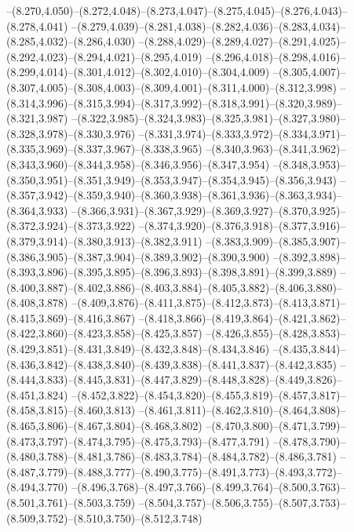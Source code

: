   --(8.270,4.050)--(8.272,4.048)--(8.273,4.047)--(8.275,4.045)--(8.276,4.043)--(8.278,4.041)%
  --(8.279,4.039)--(8.281,4.038)--(8.282,4.036)--(8.283,4.034)--(8.285,4.032)--(8.286,4.030)%
  --(8.288,4.029)--(8.289,4.027)--(8.291,4.025)--(8.292,4.023)--(8.294,4.021)--(8.295,4.019)%
  --(8.296,4.018)--(8.298,4.016)--(8.299,4.014)--(8.301,4.012)--(8.302,4.010)--(8.304,4.009)%
  --(8.305,4.007)--(8.307,4.005)--(8.308,4.003)--(8.309,4.001)--(8.311,4.000)--(8.312,3.998)%
  --(8.314,3.996)--(8.315,3.994)--(8.317,3.992)--(8.318,3.991)--(8.320,3.989)--(8.321,3.987)%
  --(8.322,3.985)--(8.324,3.983)--(8.325,3.981)--(8.327,3.980)--(8.328,3.978)--(8.330,3.976)%
  --(8.331,3.974)--(8.333,3.972)--(8.334,3.971)--(8.335,3.969)--(8.337,3.967)--(8.338,3.965)%
  --(8.340,3.963)--(8.341,3.962)--(8.343,3.960)--(8.344,3.958)--(8.346,3.956)--(8.347,3.954)%
  --(8.348,3.953)--(8.350,3.951)--(8.351,3.949)--(8.353,3.947)--(8.354,3.945)--(8.356,3.943)%
  --(8.357,3.942)--(8.359,3.940)--(8.360,3.938)--(8.361,3.936)--(8.363,3.934)--(8.364,3.933)%
  --(8.366,3.931)--(8.367,3.929)--(8.369,3.927)--(8.370,3.925)--(8.372,3.924)--(8.373,3.922)%
  --(8.374,3.920)--(8.376,3.918)--(8.377,3.916)--(8.379,3.914)--(8.380,3.913)--(8.382,3.911)%
  --(8.383,3.909)--(8.385,3.907)--(8.386,3.905)--(8.387,3.904)--(8.389,3.902)--(8.390,3.900)%
  --(8.392,3.898)--(8.393,3.896)--(8.395,3.895)--(8.396,3.893)--(8.398,3.891)--(8.399,3.889)%
  --(8.400,3.887)--(8.402,3.886)--(8.403,3.884)--(8.405,3.882)--(8.406,3.880)--(8.408,3.878)%
  --(8.409,3.876)--(8.411,3.875)--(8.412,3.873)--(8.413,3.871)--(8.415,3.869)--(8.416,3.867)%
  --(8.418,3.866)--(8.419,3.864)--(8.421,3.862)--(8.422,3.860)--(8.423,3.858)--(8.425,3.857)%
  --(8.426,3.855)--(8.428,3.853)--(8.429,3.851)--(8.431,3.849)--(8.432,3.848)--(8.434,3.846)%
  --(8.435,3.844)--(8.436,3.842)--(8.438,3.840)--(8.439,3.838)--(8.441,3.837)--(8.442,3.835)%
  --(8.444,3.833)--(8.445,3.831)--(8.447,3.829)--(8.448,3.828)--(8.449,3.826)--(8.451,3.824)%
  --(8.452,3.822)--(8.454,3.820)--(8.455,3.819)--(8.457,3.817)--(8.458,3.815)--(8.460,3.813)%
  --(8.461,3.811)--(8.462,3.810)--(8.464,3.808)--(8.465,3.806)--(8.467,3.804)--(8.468,3.802)%
  --(8.470,3.800)--(8.471,3.799)--(8.473,3.797)--(8.474,3.795)--(8.475,3.793)--(8.477,3.791)%
  --(8.478,3.790)--(8.480,3.788)--(8.481,3.786)--(8.483,3.784)--(8.484,3.782)--(8.486,3.781)%
  --(8.487,3.779)--(8.488,3.777)--(8.490,3.775)--(8.491,3.773)--(8.493,3.772)--(8.494,3.770)%
  --(8.496,3.768)--(8.497,3.766)--(8.499,3.764)--(8.500,3.763)--(8.501,3.761)--(8.503,3.759)%
  --(8.504,3.757)--(8.506,3.755)--(8.507,3.753)--(8.509,3.752)--(8.510,3.750)--(8.512,3.748)%
